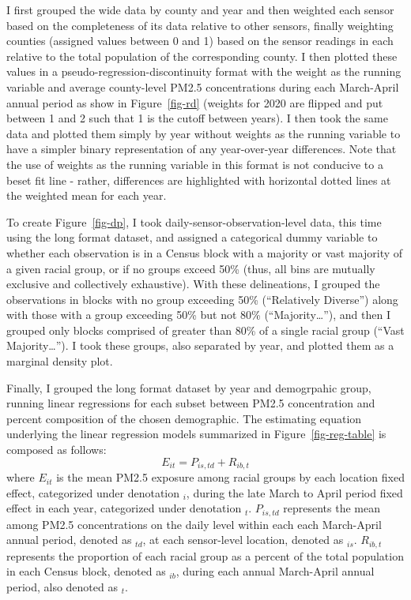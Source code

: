 \documentclass[12pt, ]{article}
\begin{document}
I first grouped the wide data by county and year and then weighted each
sensor based on the completeness of its data relative to other sensors,
finally weighting counties (assigned values between 0 and 1) based on
the sensor readings in each relative to the total population of the
corresponding county. I then plotted these values in a
pseudo-regression-discontinuity format with the weight as the running
variable and average county-level PM2.5 concentrations during each
March-April annual period as show in Figure~\ref{fig-rd} (weights for
2020 are flipped and put between 1 and 2 such that 1 is the cutoff
between years). I then took the same data and plotted them simply by
year without weights as the running variable to have a simpler binary
representation of any year-over-year differences. Note that the use of
weights as the running variable in this format is not conducive to a
beset fit line - rather, differences are highlighted with horizontal
dotted lines at the weighted mean for each year.

To create Figure~\ref{fig-dp}, I took daily-sensor-observation-level
data, this time using the long format dataset, and assigned a
categorical dummy variable to whether each observation is in a Census
block with a majority or vast majority of a given racial group, or if no
groups exceed 50\% (thus, all bins are mutually exclusive and
collectively exhaustive). With these delineations, I grouped the
observations in blocks with no group exceeding 50\% (``Relatively
Diverse'') along with those with a group exceeding 50\% but not 80\%
(``Majority\ldots{}''), and then I grouped only blocks comprised of
greater than 80\% of a single racial group (``Vast Majority\ldots{}'').
I took these groups, also separated by year, and plotted them as a
marginal density plot.

Finally, I grouped the long format dataset by year and demogrpahic
group, running linear regressions for each subset between PM2.5
concentration and percent composition of the chosen demographic. The
estimating equation underlying the linear regression models summarized
in Figure~\ref{fig-reg-table} is composed as follows:
\[E_{it} = P_{is,td} + R_{ib,t}\] where \(E_{it}\) is the mean PM2.5
exposure among racial groups by each location fixed effect, categorized
under denotation \(_{i}\), during the late March to April period fixed
effect in each year, categorized under denotation \(_{t}\).
\(P_{is,td}\) represents the mean among PM2.5 concentrations on the
daily level within each each March-April annual period, denoted as
\(_{td}\), at each sensor-level location, denoted as \(_{is}\).
\(R_{ib,t}\) represents the proportion of each racial group as a percent
of the total population in each Census block, denoted as \(_{ib}\),
during each annual March-April annual period, also denoted as \(_{t}\).
\end{document}
